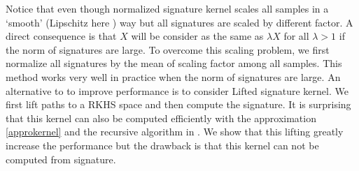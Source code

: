 \documentclass[12pt]{report}
\theoremstyle{definition}
\theoremstyle{remark}
\begin{document}
Notice that even though normalized signature kernel scales all samples in a `smooth' (Lipschitz here ) way but all signatures are scaled by different factor. A direct consequence is that $X$ will be consider as the same as $\lambda X$ for all $\lambda > 1$ if the norm of signatures are large. To overcome this scaling problem, we first normalize all signatures by the mean of scaling factor among all samples. This method works very well in practice when the norm of signatures are large. An alternative to to improve performance is to consider Lifted signature kernel. We first lift paths to a RKHS space and then compute the signature. It is surprising that this kernel can also be computed efficiently with the approximation \eqref{approkernel} and the recursive algorithm in \cite{chevyrev2018signature}. We show that this lifting greatly increase the performance but the drawback is that this kernel can not be computed from signature. 
\end{document}
